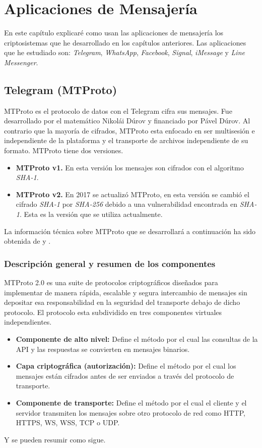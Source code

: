 \chapter{Aplicaciones de Mensajería}
\label{chap:siete}

En este capítulo explicaré como usan las aplicaciones de mensajería los criptosistemas que he desarrollado en los capítulos anteriores. Las aplicaciones que he estudiado son: \emph{Telegram}, \emph{WhatsApp}, \emph{Facebook}, \emph{Signal}, \emph{iMessage} y \emph{Line Messenger}.

\section{Telegram (MTProto)}
MTProto es el protocolo de datos con el Telegram cifra sus mensajes. Fue desarrollado por el matemático Nikolái Dúrov y financiado por Pável Dúrov. Al contrario que la mayoría de cifrados, MTProto esta enfocado en ser multisesión e independiente de la plataforma y el transporte de archivos independiente de su formato. MTProto tiene dos versiones.
\begin{itemize}
	\item \textbf{MTProto v1.} En esta versión los mensajes son cifrados con el algoritmo \emph{SHA-1}.
	\item \textbf{MTProto v2.} En 2017 se actualizó MTProto, en esta versión se cambió el cifrado \emph{SHA-1} por \emph{SHA-256} debido a una vulnerabilidad encontrada en \emph{SHA-1}. Esta es la versión que se utiliza actualmente. 
\end{itemize}
La información técnica sobre MTProto que se desarrollará a continuación ha sido obtenida de \cite{Miculan2021} y \cite{WebProto}.

\subsection{Descripción general y resumen de los componentes}
MTProto 2.0 es una suite de protocolos criptográficos diseñados para implementar de manera rápida, escalable y segura intercambio de mensajes sin depositar esa responsabilidad en la seguridad del transporte debajo de dicho protocolo.
El protocolo esta subdividido en tres componentes virtuales independientes.
\begin{itemize}
	\item \textbf{Componente de alto nivel:} Define el método por el cual las consultas de la API y las respuestas se convierten en mensajes binarios. 
	\item \textbf{Capa criptográfica (autorización):} Define el método por el cual los mensajes están cifrados antes de ser enviados a través del protocolo de transporte.
	\item \textbf{Componente de transporte:} Define el método por el cual el cliente y el servidor transmiten los mensajes sobre otro protocolo de red como HTTP, HTTPS, WS, WSS, TCP o UDP.
\end{itemize}
Y se pueden resumir como sigue.\\


